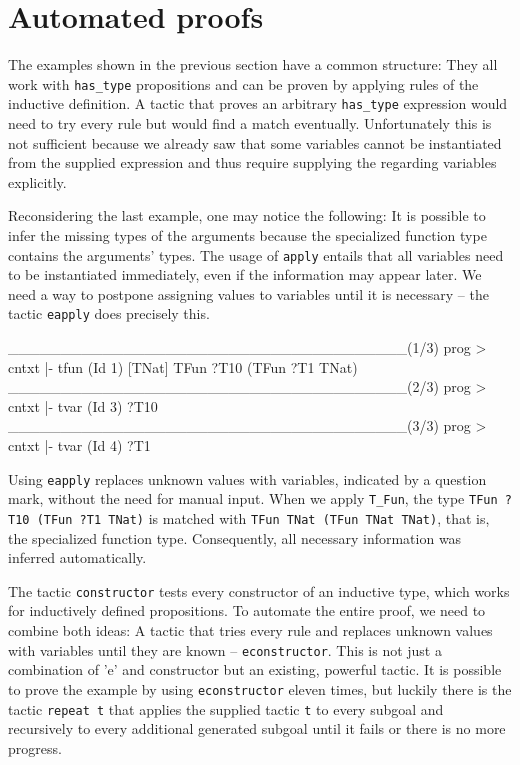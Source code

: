 \documentclass[fleqn, abstract=on]{scrreprt}
\newcommand{\coqinline}[1]{\texttt{#1}}
\begin{document}
\section{Automated proofs}
\label{autoproof}
The examples shown in the previous section have a common structure: They all work with \coqinline{has_type} propositions and can be proven by applying rules of the inductive definition. A tactic that proves an arbitrary \coqinline{has_type} expression would need to try every rule but would find a match eventually. Unfortunately this is not sufficient because we already saw that some variables cannot be instantiated from the supplied expression and thus require supplying the regarding variables explicitly.
\par
Reconsidering the last example, one may notice the following: It is possible to infer the missing types of the arguments because the specialized function type contains the arguments' types. The usage of \coqinline{apply} entails that all variables need to be instantiated immediately, even if the information may appear later. We need a way to postpone assigning values to variables until it is necessary -- the tactic \coqinline{eapply} does precisely this. 
\begin{coqcode}
______________________________________(1/3)
prog > cntxt |- tfun (Id 1) [TNat] \in TFun ?T10 (TFun ?T1 TNat)
______________________________________(2/3)
prog > cntxt |- tvar (Id 3) \in ?T10
______________________________________(3/3)
prog > cntxt |- tvar (Id 4) \in ?T1
\end{coqcode}
Using \coqinline{eapply} replaces unknown values with variables, indicated by a question mark, without the need for manual input. When we apply \coqinline{T_Fun}, the type \coqinline{TFun ?T10 (TFun ?T1 TNat)} is matched with \coqinline{TFun TNat (TFun TNat TNat)}, that is, the specialized function type. Consequently, all necessary information was inferred automatically.
\par
The tactic \coqinline{constructor} tests every constructor of an inductive type, which works for inductively defined propositions. To automate the entire proof, we need to combine both ideas: A tactic that tries every rule and replaces unknown values with variables until they are known -- \coqinline{econstructor}. This is not just a combination of 'e' and constructor but an existing, powerful tactic. It is possible to prove the example by using \coqinline{econstructor} eleven times, but luckily there is the tactic \coqinline{repeat t} that applies the supplied tactic \coqinline{t} to every subgoal and recursively to every additional generated subgoal until it fails or there is no more progress.
\end{document}
